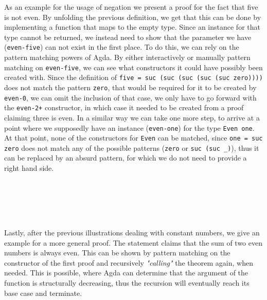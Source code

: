 As an example for the usage of negation we present a proof for the fact that five is not even. By unfolding the previous definition, we get that this can be done by implementing a function that maps to the empty type. Since an instance for that type cannot be returned, we instead need to show that the parameter we have (\verb|even-five|) can not exist in the first place. To do this, we can rely on the pattern matching powers of Agda. By either interactively or manually pattern matching on \verb|even-five|, we can see what constructors it could have possibly been created with. Since the definition of \verb|five = suc (suc (suc (suc (suc zero))))| does not match the pattern \verb|zero|, that would be required for it to be created by \verb|even-0|, we can omit the inclusion of that case, we only have to go forward with the \verb|even-2+| constructor, in which case it needed to be created from a proof claiming three is even. In a similar way we can take one more step, to arrive at a point where we supposedly have an instance (\verb|even-one|) for the type \verb|Even one|. At that point, none of the constructors for \verb|Even| can be matched, since \verb|one = suc zero| does not match any of the possible patterns (\verb|zero| or \verb|suc (suc _)|), thus it can be replaced by an absurd pattern, for which we do not need to provide a right hand side.

\begin{code}
    \>[0]\AgdaSpace{}%
    \AgdaSymbol{:}\AgdaSpace{}%
    \AgdaSpace{}%
    \AgdaSpace{}%
    \<%
    \\
    \>[0]\<%
    \\
    \>[0]\<%
    \\
    \>[0]\<%
    \\
    \>[0]\AgdaSpace{}%
    \AgdaSymbol{(}\AgdaSpace{}%
    \AgdaSymbol{(}\AgdaSpace{}%
    \AgdaSymbol{()))}\<%
\end{code}

Lastly, after the previous illustrations dealing with constant numbers, we give an example for a more general proof. The statement claims that the sum of two even numbers is always even. This can be shown by pattern matching on the constructor of the first proof and recursively \textit{"calling"} the theorem again, when needed. This is possible, where Agda can determine that the argument of the function is structurally decreasing, thus the recursion will eventually reach its base case and terminate.

